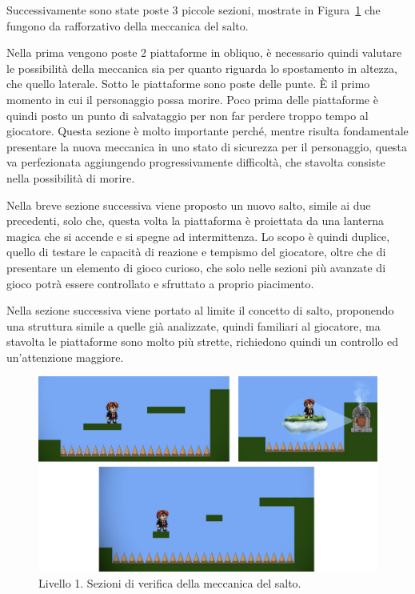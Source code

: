 Successivamente sono state poste 3 piccole sezioni, mostrate in Figura~\ref{fig:livello1_verifiche_salto} che fungono da rafforzativo della meccanica del salto. 

Nella prima vengono poste 2 piattaforme in obliquo, è necessario quindi valutare le possibilità della meccanica sia per quanto riguarda lo spostamento in altezza, che quello laterale. Sotto le piattaforme sono poste delle punte. È il primo momento in cui il personaggio possa morire. Poco prima delle piattaforme è quindi posto un punto di salvataggio per non far perdere troppo tempo al giocatore. Questa sezione è molto importante perché, mentre risulta fondamentale presentare la nuova meccanica in uno stato di sicurezza per il personaggio, questa va perfezionata aggiungendo progressivamente difficoltà, che stavolta consiste nella possibilità di morire.

Nella breve sezione successiva viene proposto un nuovo salto, simile ai due precedenti, solo che, questa volta la piattaforma è proiettata da una lanterna magica che si accende e si spegne ad intermittenza. Lo scopo è quindi duplice, quello di testare le capacità di reazione e tempismo del giocatore, oltre che di presentare un elemento di gioco curioso, che solo nelle sezioni più avanzate di gioco potrà essere controllato e sfruttato a proprio piacimento.

Nella sezione successiva viene portato al limite il concetto di salto, proponendo una struttura simile a quelle già analizzate, quindi familiari al giocatore, ma stavolta le piattaforme sono molto più strette, richiedono quindi un controllo ed un’attenzione maggiore.

\begin{figure}%
	\centering
	\includegraphics[width= 0.92\columnwidth]{images/gameDesign/43_verifiche.jpg}
	\caption{Livello 1. Sezioni di verifica della meccanica del salto.}
	\label{fig:livello1_verifiche_salto}
\end{figure}

